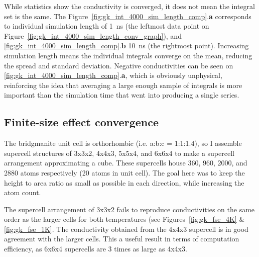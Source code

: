While statistics show the conductivity is converged, it does not mean the integral set is the same. The Figure~\ref{fig:gk_int_4000_sim_length_comp}.\textbf{a} corresponds to individual simulation length of 1~ns (the leftmost data point on Figure~\ref{fig:gk_int_4000_sim_length_conv_graph}), and \ref{fig:gk_int_4000_sim_length_comp}.\textbf{b} 10~ns (the rightmost point). Increasing simulation length means the individual integrals converge on the mean, reducing the spread and standard deviation. Negative conductivities can be seen on \ref{fig:gk_int_4000_sim_length_comp}.\textbf{a}, which is obviously unphysical, reinforcing the idea that averaging a large enough sample of integrals is more important than the simulation time that went into producing a single series.

\pagebreak


\subsection{\label{sec:3.GK.fse}Finite-size effect convergence}

The bridgmanite unit cell is orthorhombic (i.e. a:b:c = 1:1:1.4), so I assemble supercell structures of 3x3x2, 4x4x3, 5x5x4, and 6x6x4 to make a supercell arrangement approximating a cube. These supercells house 360, 960, 2000, and 2880 atoms respectively (20 atoms in unit cell). The goal here was to keep the height to area ratio as small as possible in each direction, while increasing the atom count.

The supercell arrangement of 3x3x2 fails to reproduce conductivities on the same order as the larger cells for both temperatures (see Figures~\ref{fig:gk_fse_4K} \& \ref{fig:gk_fse_1K}. The conductivity obtained from the 4x4x3 supercell is in good agreement with the larger cells. This a useful result in terms of computation efficiency, as 6x6x4 supercells are 3 times as large as 4x4x3.

